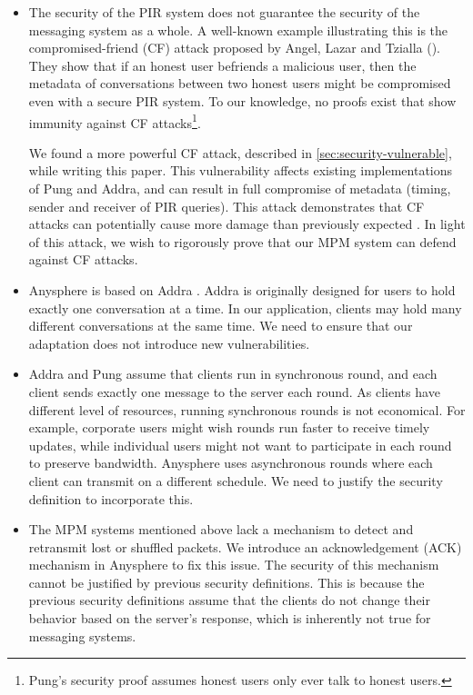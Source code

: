 \begin{itemize}
    \item The security of the PIR system does not guarantee the security of the messaging system as a whole. A well-known example illustrating this is the compromised-friend (CF) attack proposed by Angel, Lazar and Tzialla (\cite{angel2018cf}). They show that if an honest user befriends a malicious user, then the metadata of conversations between two honest users might be compromised even with a secure PIR system. To our knowledge, no proofs exist that show immunity against CF attacks\footnote{Pung's security proof \cite{angel2018thesis} assumes honest users only ever talk to honest users.}. 
    
    We found a more powerful CF attack, described in \cref{sec:security-vulnerable}, while writing this paper. This vulnerability affects existing implementations of Pung and Addra, and can result in full compromise of metadata (timing, sender and receiver of PIR queries). This attack demonstrates that CF attacks can potentially cause more damage than previously expected \cite{angel2018cf}. In light of this attack, we wish to rigorously prove that our MPM system can defend against CF attacks.
    
    \item Anysphere is based on Addra \cite{ahmad2021addra}. Addra is originally designed for users to hold exactly one conversation at a time. In our application, clients may hold many different conversations at the same time. We need to ensure that our adaptation does not introduce new vulnerabilities.
    
    \item Addra and Pung \cite{angel2016unobservable} assume that clients run in synchronous round, and each client sends exactly one message to the server each round. As clients have different level of resources, running synchronous rounds is not economical. For example, corporate users might wish rounds run faster to receive timely updates, while individual users might not want to participate in each round to preserve bandwidth. Anysphere uses asynchronous rounds where each client can transmit on a different schedule. We need to justify the security definition to incorporate this.
    
    \item The MPM systems mentioned above lack a mechanism to detect and retransmit lost or shuffled packets. We introduce an acknowledgement (ACK) mechanism in Anysphere to fix this issue. The security of this mechanism cannot be justified by previous security definitions. This is because the previous security definitions assume that the clients do not change their behavior based on the server's response, which is inherently not true for messaging systems.
\end{itemize}

